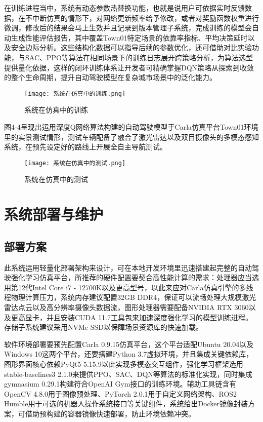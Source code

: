 在训练进程当中，系统有动态参数热替换功能，也就是说用户可依据实时反馈数据，在不中断仿真的情形下，对网络更新频率给予修改，或者对奖励函数权重进行微调，修改后的结果会马上生效并且记录到版本管理子系统，完成训练的模型会自动生成性能评估报告，其中覆盖Town01特定场景的依靠率指标、平均决策延时以及安全边际分析。这些结构化数据可以指导后续的参数优化，还可借助对比实验功能，与SAC、PPO等算法在相同场景下的训练日志展开跨策略分析，为算法选型提供量化依据，这样的闭环训练体系让开发者可精确掌握DQN策略从探索到收敛的整个生命周期，提升自动驾驶模型在复杂城市场景中的泛化能力。



\begin{figure}[hbt]
	\centering
	\texttt{[image: 系统在仿真中的训练.png]}
	\caption{系统在仿真中的训练}
	\label{f.example}
\end{figure}

图4-4呈现出运用深度Q网络算法构建的自动驾驶模型于Carla仿真平台Town01环境里的实景测试情形，测试车辆配备了融合了激光雷达以及双目摄像头的多模态感知系统，在预先设定好的路线上开展全自主导航测试。

\begin{figure}[hbt]
	\centering
	\texttt{[image: 系统在仿真中的测试.png]}
	\caption{系统在仿真中的测试}
	\label{f.example}
\end{figure}


\section{系统部署与维护}
\subsection{部署方案}

此系统运用轻量化部署架构来设计，可在本地开发环境里迅速搭建起完整的自动驾驶强化学习仿真平台，所推荐的硬件配置要契合高性能计算的需求：处理器应当选用第12代Intel Core i7 - 12700K以及更高型号，以此来应对Carla仿真引擎的多线程物理计算压力，系统内存建议配置32GB DDR4，保证可以流畅处理大规模激光雷达点云以及高分辨率摄像头数据流，图形处理器需要配备NVIDIA RTX 3060以及更高显卡，并且安装CUDA 11.7工具包来加速深度强化学习的模型训练进程。存储子系统建议采用NVMe SSD以保障场景资源库的快速加载。

软件环境部署要预先配置Carla 0.9.15仿真平台，这个平台适配Ubuntu 20.04以及Windows 10这两个平台，还要搭建Python 3.7虚拟环境，并且集成关键依赖库，图形界面核心依赖PyQt5 5.15.9以此实现多模态交互组件，强化学习框架选用stable-baselines3 2.1.0来提供PPO、SAC、DQN等算法的标准化实现，同时集成gymnasium 0.29.1构建符合OpenAI Gym接口的训练环境。辅助工具链含有OpenCV 4.8.0用于图像预处理、PyTorch 2.0.1用于自定义网络架构、ROS2 Humble用于可选的机器人操作系统接口等关键组件，系统给出Docker镜像封装方案，可借助预构建的容器镜像快速部署，防止环境依赖冲突。

